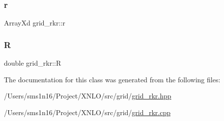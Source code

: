 \subsubsection{\texorpdfstring{r}{r}}
{\footnotesize\ttfamily Array\+Xd grid\+\_\+rkr\+::r}

\mbox{\label{classgrid__rkr_a2da8ae00c520a66c9cac2784a2149dcb}} 
\subsubsection{\texorpdfstring{R}{R}}
{\footnotesize\ttfamily double grid\+\_\+rkr\+::R}



The documentation for this class was generated from the following files\+:\begin{DoxyCompactItemize}
\item 
/\+Users/sms1n16/\+Project/\+X\+N\+L\+O/src/grid/\hyperlink{grid__rkr_8hpp}{grid\+\_\+rkr.\+hpp}\item 
/\+Users/sms1n16/\+Project/\+X\+N\+L\+O/src/grid/\hyperlink{grid__rkr_8cpp}{grid\+\_\+rkr.\+cpp}\end{DoxyCompactItemize}
